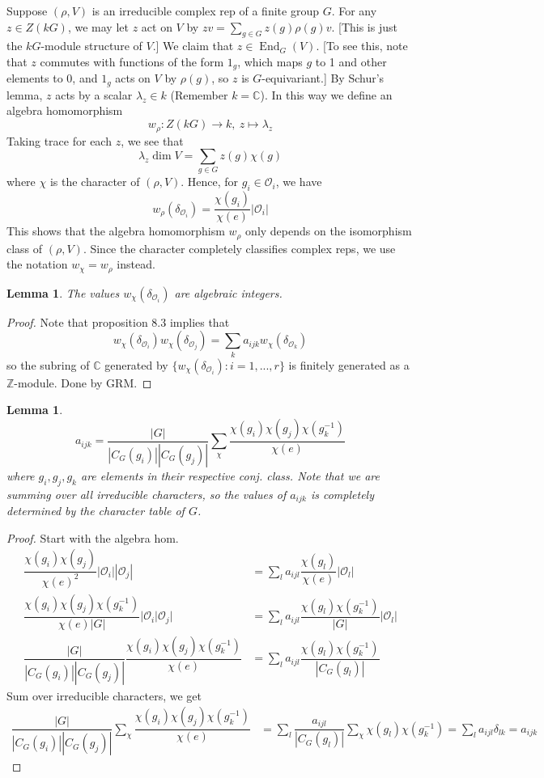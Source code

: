 \documentclass{article}
\theoremstyle{definition}
\theoremstyle{remark}
\theoremstyle{plain}
\newtheorem{lem}[defn]{Lemma}
\newcommand{\ZZ}{\mathbb{Z}}
\newcommand{\CC}{\mathbb{C}}
\begin{document}
Suppose $(\rho, V)$ is an irreducible complex rep of a finite group $G$. For any $z\in Z(kG)$, we may let $z$ act on $V$ by $zv=\sum_{g\in G}z(g)\rho(g)v$. [This is just the $kG$-module structure of $V$.] We claim that $z\in\operatorname{End}_G(V)$. [To see this, note that $z$ commutes with functions of the form $1_g$, which maps $g$ to 1 and other elements to $0$, and $1_g$ acts on $V$ by $\rho(g)$, so $z$ is $G$-equivariant.] By Schur's lemma, $z$ acts by a scalar $\lambda_z\in k$ (Remember $k=\CC$). In this way we define an algebra homomorphism 
\[w_\rho:Z(kG)\to k,\ z\mapsto \lambda_z\]
Taking trace for each $z$, we see that
\[\lambda_z\dim V=\sum_{g\in G}z(g)\chi(g)\]
where $\chi$ is the character of $(\rho, V)$. Hence, for $g_i\in \mathcal O_i$, we have
\[w_\rho(\delta_{\mathcal O_i})=\dfrac{\chi(g_i)}{\chi(e)}|\mathcal O_i|\]
This shows that the algebra homomorphism $w_\rho$ only depends on the isomorphism class of $(\rho, V)$. Since the character completely classifies complex reps, we use the notation $w_\chi=w_\rho$ instead.
\begin{lem}
    The values $w_\chi(\delta_{\mathcal O_i})$ are algebraic integers.
\end{lem}
\begin{proof}
    Note that proposition 8.3 implies that
    \[w_\chi(\delta_{\mathcal O_i})w_\chi(\delta_{\mathcal O_j})=\sum_{k}a_{ijk}w_\chi(\delta_{\mathcal O_k})\]
    so the subring of $\CC$ generated by $\{w_\chi(\delta_{\mathcal O_i}):i=1,...,r\}$ is finitely generated as a $\ZZ$-module. Done by GRM.
\end{proof}
\begin{lem}
    \[a_{ijk}=\dfrac{|G|}{|C_G(g_i)||C_G(g_j)|}\sum_\chi\dfrac{\chi(g_i)\chi(g_j)\chi(g_k^{-1})}{\chi(e)}\]
    where $g_i, g_j, g_k$ are elements in their respective conj. class. Note that we are summing over all irreducible characters, so the values of $a_{ijk}$ is completely determined by the character table of $G$. 
\end{lem}
\begin{proof}
    Start with the algebra hom.
    \begin{align*}
    \dfrac{\chi(g_i)\chi(g_j)}{\chi(e)^2}|\mathcal O_i||\mathcal O_j|&=\sum_{l}a_{ijl}\dfrac{\chi(g_l)}{\chi(e)}|\mathcal O_l|\\
    \dfrac{\chi(g_i)\chi(g_j)\chi(g_k^{-1})}{\chi(e)|G|}|\mathcal O_i|\mathcal O_j|&=\sum_la_{ijl}\dfrac{\chi(g_l)\chi(g_k^{-1})}{|G|}|\mathcal O_l|\\
    \dfrac{|G|}{|C_G(g_i)||C_G(g_j)|}\dfrac{\chi(g_i)\chi(g_j)\chi(g_k^{-1})}{\chi(e)}&=\sum_la_{ijl}\dfrac{\chi(g_l)\chi(g_k^{-1})}{|C_G(g_l)|}
    \end{align*}
    Sum over irreducible characters, we get
    \begin{align*}
         \dfrac{|G|}{|C_G(g_i)||C_G(g_j)|}\sum_\chi\dfrac{\chi(g_i)\chi(g_j)\chi(g_k^{-1})}{\chi(e)}&=\sum_l\dfrac{a_{ijl}}{|C_G(g_l)|}\sum_\chi\chi(g_l)\chi(g_k^{-1})=\sum_la_{ijl}\delta_{lk}=a_{ijk}
    \end{align*}
\end{proof}
\end{document}
